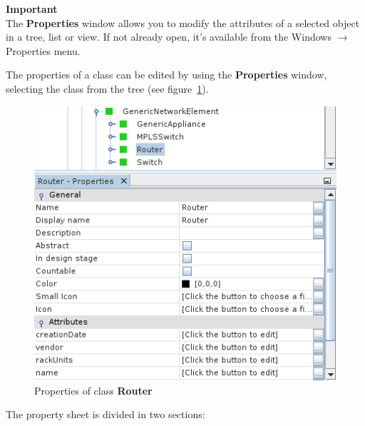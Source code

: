 \documentclass[a4paper]{article}
\begin{document}
			\begin{framed} {\large \textbf{Important}} \\
					The \textbf{Properties} window allows you to modify the attributes of a selected object in a tree, list or view. If not already open, it's available from the Windows $\rightarrow$ Properties menu.
			\end{framed}
			The properties of a class can be edited by using the \textbf{Properties} window, selecting the class from the tree (see figure~\ref{fig:properties_class_node}). 
			\begin{figure}[h!]
				\centering
				\includegraphics[width=0.5\linewidth]{img/properties_class_node.png}
				\caption{Properties of class \textbf{Router}}
				\label{fig:properties_class_node}
			\end{figure}
			The  property  sheet  is  divided  in  two  sections: 
\end{document}
